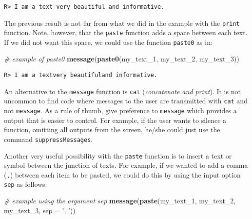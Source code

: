 \documentclass[
  12pt,
]{book}
\newenvironment{Shaded}{\begin{snugshade}}{\end{snugshade}}
\newcommand{\CommentTok}[1]{\textcolor[rgb]{0.37,0.37,0.37}{\textit{#1}}}
\newcommand{\DataTypeTok}[1]{\textcolor[rgb]{0.27,0.27,0.27}{#1}}
\newcommand{\DecValTok}[1]{\textcolor[rgb]{0.06,0.06,0.06}{#1}}
\newcommand{\KeywordTok}[1]{\textcolor[rgb]{0.27,0.27,0.27}{\textbf{#1}}}
\newcommand{\NormalTok}[1]{#1}
\newcommand{\StringTok}[1]{\textcolor[rgb]{0.5,0.5,0.5}{#1}}
\newenvironment{rmdimportant}
{\begin{importantblock}
		
	} {\end{importantblock}}
\begin{document}
\begin{verbatim}
R> I am a text very beautiful and informative.
\end{verbatim}

The previous result is not far from what we did in the example with the \texttt{print} function. Note, however, that the \texttt{paste} function adds a space between each text. If we did not want this space, we could use the function \texttt{paste0} as in:

\begin{Shaded}
\begin{Highlighting}[]
\CommentTok{# example of paste0}
\KeywordTok{message}\NormalTok{(}\KeywordTok{paste0}\NormalTok{(my_text_}\DecValTok{1}\NormalTok{, my_text_}\DecValTok{2}\NormalTok{, my_text_}\DecValTok{3}\NormalTok{))}
\end{Highlighting}
\end{Shaded}

\begin{verbatim}
R> I am a textvery beautifuland informative.
\end{verbatim}

\begin{rmdimportant}
An alternative to the \texttt{message} function is \texttt{cat}
(\emph{concatenate and print}). It is not uncommon to find code where
messages to the user are transmitted with \texttt{cat} and not
\texttt{message}. As a rule of thumb, give preference to
\texttt{message} which provides a output that is easier to control. For
example, if the user wants to silence a function, omitting all outputs
from the screen, he/she could just use the command
\texttt{suppressMessages}.
\end{rmdimportant}

Another very useful possibility with the \texttt{paste} function is to insert a text or symbol between the junction of texts. For example, if we wanted to add a comma (\texttt{,}) between each item to be pasted, we could do this by using the input option \texttt{sep} as follows:

\begin{Shaded}
\begin{Highlighting}[]
\CommentTok{# example using the argument sep}
\KeywordTok{message}\NormalTok{(}\KeywordTok{paste}\NormalTok{(my_text_}\DecValTok{1}\NormalTok{, my_text_}\DecValTok{2}\NormalTok{, my_text_}\DecValTok{3}\NormalTok{, }\DataTypeTok{sep =} \StringTok{', '}\NormalTok{))}
\end{Highlighting}
\end{Shaded}
\end{document}
